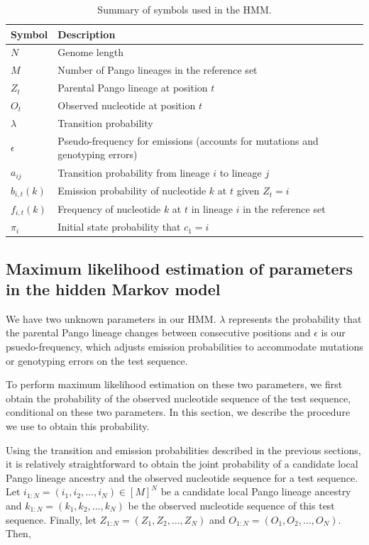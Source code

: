 \documentclass[11pt,oneside,letterpaper]{article}
\newcommand{\States}{[M]} %
\begin{document}
\begin{table}[ht]
\centering
\begin{tabular}{ll}
\toprule
Symbol & Description \\
\midrule
$N$ & Genome length \\
$M$ & Number of Pango lineages in the reference set \\
$Z_t$ & Parental Pango lineage at position $t$ \\
$O_t$ & Observed nucleotide at position $t$ \\
$\lambda$ & Transition probability \\
$\epsilon$ & Pseudo-frequency for emissions (accounts for mutations and genotyping errors) \\
$a_{ij}$ & Transition probability from lineage $i$ to lineage $j$ \\
$b_{i,t}(k)$ & Emission probability of nucleotide $k$ at $t$ given $Z_t=i$ \\
$f_{i,t}(k)$ & Frequency of nucleotide $k$ at $t$ in lineage $i$ in the reference set \\
$\pi_i$ & Initial state probability that $c_1=i$ \\
\bottomrule
\end{tabular}
\caption[Summary of symbols used in the hidden Markov model]{Summary of symbols used in the HMM.}
\end{table}

\subsection{Maximum likelihood estimation of parameters in the hidden Markov model}\label{sec:MLEHMM}

We have two unknown parameters in our HMM. $\lambda$ represents the probability that the parental Pango lineage changes between consecutive positions and $\epsilon$ is our psuedo-frequency, which adjusts emission probabilities to accommodate mutations or genotyping errors on the test sequence.

To perform maximum likelihood estimation on these two parameters, we first obtain the probability of the observed nucleotide sequence of the test sequence, conditional on these two parameters. In this section, we describe the procedure we use to obtain this probability.

Using the transition and emission probabilities described in the previous sections, it is relatively straightforward to obtain the joint probability of a candidate local Pango lineage ancestry and the observed nucleotide sequence for a test sequence. Let $i_{1:N} = (i_1,i_2,\hdots,i_N) \in\States^N$ be a candidate local Pango lineage ancestry and $k_{1:N} = (k_1,k_2,\hdots,k_N)$ be the observed nucleotide sequence of this test sequence. Finally, let $Z_{1:N} = (Z_1,Z_2,\hdots,Z_N)$ and $O_{1:N} = (O_1,O_2,\hdots,O_N)$. Then,
\end{document}
